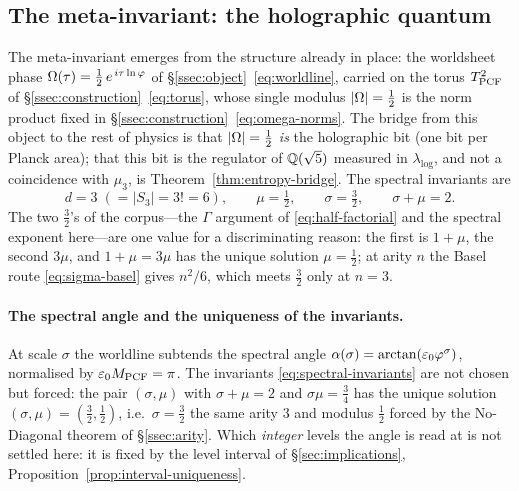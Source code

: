\subsection{The meta-invariant: the holographic quantum}\label{ssec:meta}
The meta-invariant emerges from the structure already in place: the worldsheet phase
$\Omega(\tau)=\tfrac12\,e^{\,i\tau\ln\varphi}$ of \S\ref{ssec:object}~\eqref{eq:worldline},
carried on the torus $T^2_{\mathrm{PCF}}$ of \S\ref{ssec:construction}~\eqref{eq:torus}, whose single
modulus $|\Omega|=\tfrac12$ is the norm product fixed in
\S\ref{ssec:construction}~\eqref{eq:omega-norms}. The bridge from this object to the rest of
physics is that $|\Omega|=\tfrac12$ \emph{is} the holographic bit (one bit per Planck area); that this
bit is the regulator of $\mathbb{Q}(\sqrt5)$ measured in $\lambda_{\log}$, and not a coincidence with
$\mu_3$, is Theorem~\ref{thm:entropy-bridge}. The
spectral invariants are
\begin{equation}\label{eq:spectral-invariants}
  d=3\;(=|S_{3}|=3!=6),\qquad \mu=\tfrac12,\qquad \sigma=\tfrac32,\qquad \sigma+\mu=2 .
\end{equation}
The two $\tfrac32$'s of the corpus---the $\Gamma$ argument of \eqref{eq:half-factorial} and the
spectral exponent here---are one value for a discriminating reason: the first is $1+\mu$, the
second $3\mu$, and $1+\mu=3\mu$ has the unique solution $\mu=\tfrac12$; at arity $n$ the Basel
route \eqref{eq:sigma-basel} gives $n^{2}/6$, which meets $\tfrac32$ only at $n=3$.


\paragraph{The spectral angle and the uniqueness of the invariants.}
At scale $\sigma$ the worldline subtends the spectral angle
$\alpha(\sigma)=\arctan(\varepsilon_{0}\varphi^{\sigma})$, normalised by $\varepsilon_{0} M_{\mathrm{PCF}}=\pi$.
The invariants \eqref{eq:spectral-invariants} are not chosen but
forced: the pair $(\sigma,\mu)$ with $\sigma+\mu=2$ and $\sigma\mu=\tfrac34$ has the unique
solution $(\sigma,\mu)=(\tfrac32,\tfrac12)$,
i.e.\ $\sigma=\tfrac32$
the same arity $3$ and modulus $\tfrac12$ forced by the No-Diagonal theorem
of \S\ref{ssec:arity}. Which \emph{integer} levels the angle is read at is not settled here: it is
fixed by the level interval of \S\ref{sec:implications}, Proposition~\ref{prop:interval-uniqueness}.

